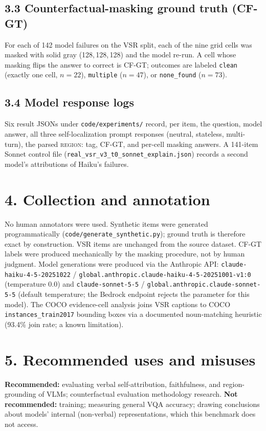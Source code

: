 \documentclass[11pt]{article}
\begin{document}
\subsection*{3.3 Counterfactual-masking ground truth (CF-GT)}
For each of 142 model failures on the VSR split, each of the nine grid
cells was masked with solid gray (128,\,128,\,128) and the model re-run.
A cell whose masking flips the answer to correct is CF-GT; outcomes are
labeled \texttt{clean} (exactly one cell, $n{=}22$),
\texttt{multiple} ($n{=}47$), or \texttt{none\_found} ($n{=}73$).

\subsection*{3.4 Model response logs}
Six result JSONs under \texttt{code/experiments/} record, per item, the
question, model answer, all three self-localization prompt responses
(neutral, stateless, multi-turn), the parsed \textsc{region:} tag, CF-GT,
and per-cell masking answers. A 141-item Sonnet control file
(\texttt{real\_vsr\_v3\_t0\_sonnet\_explain.json}) records a second
model's attributions of Haiku's failures.

\section*{4. Collection and annotation}
No human annotators were used. Synthetic items were generated
programmatically (\texttt{code/generate\_synthetic.py}); ground truth is
therefore exact by construction. VSR items are unchanged from the source
dataset. CF-GT labels were produced mechanically by the masking
procedure, not by human judgment. Model generations were produced via the
Anthropic API: \texttt{claude-haiku-4-5-20251022} /
\texttt{global.anthropic.claude-haiku-4-5-20251001-v1:0} (temperature 0.0)
and \texttt{claude-sonnet-5-5} /
\texttt{global.anthropic.claude-sonnet-5-5} (default temperature; the
Bedrock endpoint rejects the parameter for this model). The COCO
evidence-cell analysis joins VSR captions to COCO
\texttt{instances\_train2017} bounding boxes via a documented noun-matching
heuristic (93.4\% join rate; a known limitation).

\section*{5. Recommended uses and misuses}
\textbf{Recommended:} evaluating verbal self-attribution, faithfulness,
and region-grounding of VLMs; counterfactual evaluation methodology
research. \textbf{Not recommended:} training; measuring general VQA
accuracy; drawing conclusions about models' internal (non-verbal)
representations, which this benchmark does not access.
\end{document}
